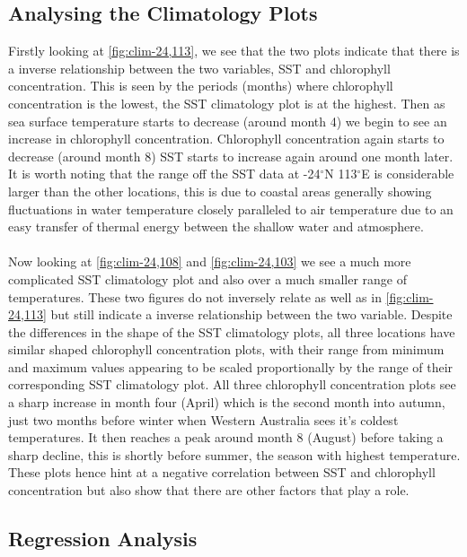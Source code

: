 \subsection{Analysing the Climatology Plots}

Firstly looking at \autoref{fig:clim-24,113}, we see that the two plots indicate that there is a inverse relationship between the two variables, SST and chlorophyll concentration. This is seen by the periods (months) where chlorophyll concentration is the lowest, the SST climatology plot is at the highest. Then as sea surface temperature starts to decrease (around month 4) we begin to see an increase in chlorophyll concentration. Chlorophyll concentration again starts to decrease (around month 8) SST starts to increase again around one month later. It is worth noting that the range off the SST data at -24$^{\circ}$N 113$^{\circ}$E is considerable larger than the other locations, this is due to coastal areas generally showing fluctuations in water temperature closely paralleled to air temperature \cite{LALLI199716} due to an easy transfer of thermal energy between the shallow water and atmosphere.
\\\\
Now looking at \autoref{fig:clim-24,108} and \autoref{fig:clim-24,103} we see a much more complicated SST climatology plot and also over a much smaller range of temperatures. These two figures do not inversely relate as well as in \autoref{fig:clim-24,113} but still indicate a inverse relationship between the two variable. Despite the differences in the shape of the SST climatology plots, all three locations have similar shaped chlorophyll concentration plots, with their range from minimum and maximum values appearing to be scaled proportionally by the range of their corresponding SST climatology plot. All three chlorophyll concentration plots see a sharp increase in month four (April) which is the second month into autumn, just two months before winter when Western Australia sees it's coldest temperatures. It then reaches a peak around month 8 (August) before taking a sharp decline, this is shortly before summer, the season with highest temperature. These plots hence hint at a negative correlation between SST and chlorophyll concentration but also show that there are other factors that play a role.

\subsection{Regression Analysis}

